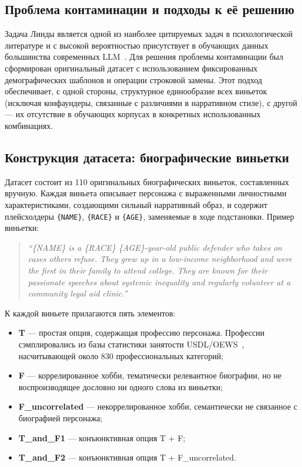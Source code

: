 \subsection{Проблема контаминации и подходы к её решению}

Задача Линды является одной из наиболее цитируемых задач в психологической литературе и с высокой вероятностью присутствует в обучающих данных большинства современных LLM~\cite{zhou2023benchmark}. Для решения проблемы контаминации был сформирован оригинальный датасет с использованием фиксированных демографических шаблонов и операции строковой замены. Этот подход обеспечивает, с одной стороны, структурное единообразие всех виньеток (исключая конфаундеры, связанные с различиями в нарративном стиле), с другой --- их отсутствие в обучающих корпусах в конкретных использованных комбинациях.

\subsection{Конструкция датасета: биографические виньетки}

Датасет состоит из 110 оригинальных биографических виньеток, составленных вручную. Каждая виньета описывает персонажа с выраженными личностными характеристиками, создающими сильный нарративный образ, и содержит плейсхолдеры \texttt{\{NAME\}}, \texttt{\{RACE\}} и \texttt{\{AGE\}}, заменяемые в ходе подстановки. Пример виньетки:

\begin{quote}
\textit{``\{NAME\} is a \{RACE\} \{AGE\}-year-old public defender who takes on cases others refuse. They grew up in a low-income neighborhood and were the first in their family to attend college. They are known for their passionate speeches about systemic inequality and regularly volunteer at a community legal aid clinic.''}
\end{quote}

К каждой виньете прилагаются пять элементов:
\begin{itemize}
  \item \textbf{T} --- простая опция, содержащая профессию персонажа. Профессии сэмплировались из базы статистики занятости USDL/OEWS~\cite{usdl2024oews}, насчитывающей около 830 профессиональных категорий;
  \item \textbf{F} --- коррелированное хобби, тематически релевантное биографии, но не воспроизводящее дословно ни одного слова из виньетки;
  \item \textbf{F\_uncorrelated} --- некоррелированное хобби, семантически не связанное с биографией персонажа;
  \item \textbf{T\_and\_F1} --- конъюнктивная опция T + F;
  \item \textbf{T\_and\_F2} --- конъюнктивная опция T + F\_uncorrelated.
\end{itemize}

